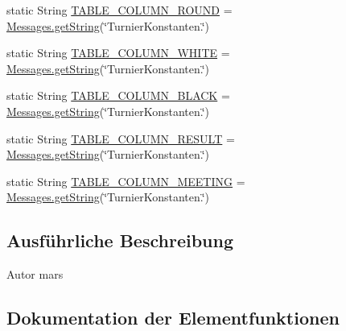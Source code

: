 \begin{DoxyCompactItemize}
\item 
static String \hyperlink{classde_1_1turnierverwaltung_1_1model_1_1_tournament_constants_ad4abb12849d31936468784428ccc1d98}{T\+A\+B\+L\+E\+\_\+\+C\+O\+L\+U\+M\+N\+\_\+\+R\+O\+U\+ND} = \hyperlink{classde_1_1turnierverwaltung_1_1model_1_1_messages_aa5a2a96b8a7e711b94954e273f603b68}{Messages.\+get\+String}(\char`\"{}Turnier\+Konstanten.\char`\"{})
\item 
static String \hyperlink{classde_1_1turnierverwaltung_1_1model_1_1_tournament_constants_a11fc14e5ab1295302e61278f4b4df3ae}{T\+A\+B\+L\+E\+\_\+\+C\+O\+L\+U\+M\+N\+\_\+\+W\+H\+I\+TE} = \hyperlink{classde_1_1turnierverwaltung_1_1model_1_1_messages_aa5a2a96b8a7e711b94954e273f603b68}{Messages.\+get\+String}(\char`\"{}Turnier\+Konstanten.\char`\"{})
\item 
static String \hyperlink{classde_1_1turnierverwaltung_1_1model_1_1_tournament_constants_a1812cee228d8be043492e148a1eeb7fe}{T\+A\+B\+L\+E\+\_\+\+C\+O\+L\+U\+M\+N\+\_\+\+B\+L\+A\+CK} = \hyperlink{classde_1_1turnierverwaltung_1_1model_1_1_messages_aa5a2a96b8a7e711b94954e273f603b68}{Messages.\+get\+String}(\char`\"{}Turnier\+Konstanten.\char`\"{})
\item 
static String \hyperlink{classde_1_1turnierverwaltung_1_1model_1_1_tournament_constants_a4c3f1497e39ac8183e29c01f4b897eb0}{T\+A\+B\+L\+E\+\_\+\+C\+O\+L\+U\+M\+N\+\_\+\+R\+E\+S\+U\+LT} = \hyperlink{classde_1_1turnierverwaltung_1_1model_1_1_messages_aa5a2a96b8a7e711b94954e273f603b68}{Messages.\+get\+String}(\char`\"{}Turnier\+Konstanten.\char`\"{})
\item 
static String \hyperlink{classde_1_1turnierverwaltung_1_1model_1_1_tournament_constants_aea07cf84ec654d82a79b319d8876c17c}{T\+A\+B\+L\+E\+\_\+\+C\+O\+L\+U\+M\+N\+\_\+\+M\+E\+E\+T\+I\+NG} = \hyperlink{classde_1_1turnierverwaltung_1_1model_1_1_messages_aa5a2a96b8a7e711b94954e273f603b68}{Messages.\+get\+String}(\char`\"{}Turnier\+Konstanten.\char`\"{})
\end{DoxyCompactItemize}


\subsection{Ausführliche Beschreibung}
\begin{DoxyAuthor}{Autor}
mars 
\end{DoxyAuthor}


\subsection{Dokumentation der Elementfunktionen}
